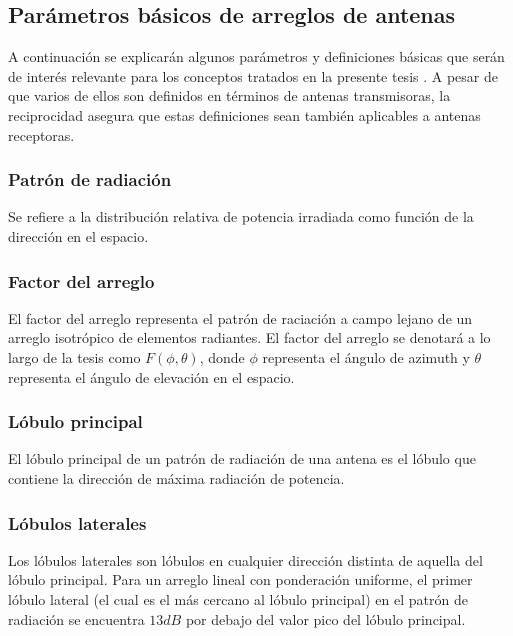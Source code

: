 \subsection{Parámetros básicos de arreglos de antenas}

A continuación se explicarán algunos parámetros y definiciones básicas que serán de interés relevante para los conceptos tratados en la presente tesis \cite{Litva}. A pesar de que varios de ellos son definidos en términos de antenas transmisoras, la reciprocidad asegura que estas definiciones sean también aplicables a antenas receptoras.

\subsubsection{Patrón de radiación}

Se refiere a la distribución relativa de potencia irradiada como función de la dirección en el espacio.

\subsubsection{Factor del arreglo}

El factor del arreglo representa el patrón de raciación a campo lejano de un arreglo isotrópico de elementos radiantes. El factor del arreglo se denotará a lo largo de la tesis como $F(\phi,\theta)$, donde $\phi$ representa el ángulo de azimuth y $\theta$ representa el ángulo de elevación en el espacio.

\subsubsection{Lóbulo principal}

El lóbulo principal de un patrón de radiación de una antena es el lóbulo que contiene la dirección de máxima radiación de potencia.

\subsubsection{Lóbulos laterales}

Los lóbulos laterales son lóbulos en cualquier dirección distinta de aquella del lóbulo principal. Para un arreglo lineal con ponderación uniforme, el primer lóbulo lateral (el cual es el más cercano al lóbulo principal) en el patrón de radiación se encuentra $13 dB$ por debajo del valor pico del lóbulo principal.

